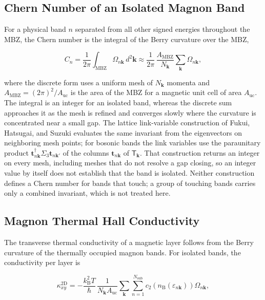 \subsection{Chern Number of an Isolated Magnon Band}

For a physical band \(n\) separated from all other signed energies throughout the MBZ, the Chern number is the integral of the Berry curvature over the MBZ,

\begin{equation}\label{eq-lswt-magnon-chern-number}
C_n=\frac{1}{2\pi}\int_{\mathrm{MBZ}}\Omega_{n\mathbf k}\,d^2\mathbf k
\approx\frac{1}{2\pi}\,\frac{A_{\mathrm{MBZ}}}{N_{\mathbf k}}\sum_{\mathbf k}\Omega_{n\mathbf k},
\end{equation}

where the discrete form uses a uniform mesh of \(N_{\mathbf k}\) momenta and \(A_{\mathrm{MBZ}}=(2\pi)^2/A_{\mathrm{uc}}\) is the area of the MBZ for a magnetic unit cell of area \(A_{\mathrm{uc}}\). The integral is an integer for an isolated band, whereas the discrete sum approaches it as the mesh is refined and converges slowly where the curvature is concentrated near a small gap. The lattice link-variable construction of Fukui, Hatsugai, and Suzuki evaluates the same invariant from the eigenvectors on neighboring mesh points; for bosonic bands the link variables use the paraunitary product \(\mathbf t_{n\mathbf k}^\dagger\Sigma_3\mathbf t_{n\mathbf k'}\) of the columns \(\mathbf t_{n\mathbf k}\) of \(\mathsf T_{\mathbf k}\). That construction returns an integer on every mesh, including meshes that do not resolve a gap closing, so an integer value by itself does not establish that the band is isolated. Neither construction defines a Chern number for bands that touch; a group of touching bands carries only a combined invariant, which is not treated here.

\subsection{Magnon Thermal Hall Conductivity}

The transverse thermal conductivity of a magnetic layer follows from the Berry curvature of the thermally occupied magnon bands. For isolated bands, the conductivity per layer is

\begin{equation}\label{eq-lswt-magnon-thermal-hall}
\kappa^{\mathrm{2D}}_{xy}
=-\frac{k_{\mathrm B}^2T}{\hbar}\,\frac{1}{N_{\mathbf k}A_{\mathrm{uc}}}
\sum_{\mathbf k}\sum_{n=1}^{N_{\mathrm{sub}}}
c_2\!\left(n_{\mathrm B}(\varepsilon_{n\mathbf k})\right)\Omega_{n\mathbf k},
\end{equation}

